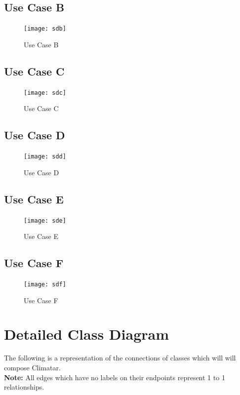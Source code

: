 \documentclass[]{article}
\begin{document}
\subsection{Use Case B}
\label{sub:overview}
\begin{figure}[H]
    \centering
    \texttt{[image: sdb]}
    \caption{Use Case B}
    \label{fig:sdb}
\end{figure}

\subsection{Use Case C}
\label{sub:overview}
\begin{figure}[H]
    \centering
    \texttt{[image: sdc]}
    \caption{Use Case C}
    \label{fig:sdc}
\end{figure}

\subsection{Use Case D}
\label{sub:overview}
\begin{figure}[H]
    \centering
    \texttt{[image: sdd]}
    \caption{Use Case D}
    \label{fig:sdd}
\end{figure}

\subsection{Use Case E}
\label{sub:overview}
\begin{figure}[H]
    \centering
    \texttt{[image: sde]}
    \caption{Use Case E}
    \label{fig:sde}
\end{figure}

\subsection{Use Case F}
\label{sub:overview}
\begin{figure}[H]
    \centering
    \texttt{[image: sdf]}
    \caption{Use Case F}
    \label{fig:sdf}
\end{figure}

\pagebreak
\section{Detailed Class Diagram}
\label{sec:detailed_class_diagram}
The following is a representation of the connections of classes which will will compose Climatar. \\
\textbf{Note:} All edges which have no labels on their endpoints represent 1 to 1 relationships.
\end{document}
